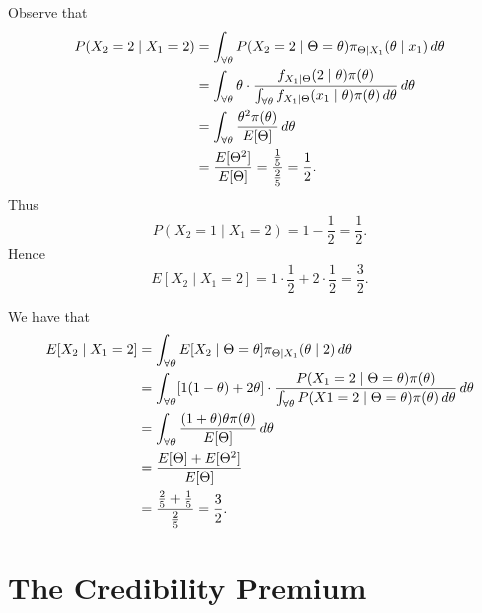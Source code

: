 \documentclass[notoc,notitlepage]{tufte-book}
\begin{document}
\begin{solution}
   Observe that
  \begin{align*}
    P(X_2 = 2 \mid X_1 = 2)
    &= \int_{\forall \theta} P(X_2 = 2 \mid \Theta = \theta) \pi_{\Theta \mid
      X_1}(\theta \mid x_1) \mathop{}\!d{\theta} \\
    &= \int_{\forall \theta} \theta \cdot \frac{f_{X_1 \mid \Theta}(2 \mid
      \theta) \pi(\theta)}{\int_{\forall \theta} f_{X_1 \mid \Theta}(x_1 \mid
      \theta) \pi(\theta) \mathop{}\!d{\theta}} \mathop{}\!d{\theta} \\
    &= \int_{\forall \theta} \frac{\theta^2 \pi(\theta)}{E[\Theta]} \mathop{}\!d{\theta}
    \\
    &= \frac{E[\Theta^2]}{E[\Theta]} = \frac{\frac{1}{5}}{\frac{2}{5}} =
    \frac{1}{2}.
  \end{align*}
  Thus
  \begin{equation*}
    P(X_2 = 1 \mid X_1 = 2) = 1 - \frac{1}{2} = \frac{1}{2}.
  \end{equation*}
  Hence
  \begin{equation*}
    E[X_2 \mid X_1 = 2] = 1 \cdot \frac{1}{2} + 2 \cdot \frac{1}{2} =
    \frac{3}{2}.
  \end{equation*}

  \noindent
   We have that
  \begin{align*}
    E[X_2 \mid X_1 = 2]
    &= \int_{\forall \theta} E[X_2 \mid \Theta = \theta] \pi_{\Theta \mid
      X_1}(\theta \mid 2) \mathop{}\!d{\theta} \\
    &= \int_{\forall \theta} [1(1 - \theta) + 2\theta] \cdot
    \frac{P(X_1 = 2 \mid \Theta = \theta)\pi(\theta)}{\int_{\forall \theta} P(X1
      = 2 \mid \Theta = \theta)\pi(\theta) \mathop{}\!d{\theta}} \mathop{}\!d{\theta} \\
    &= \int_{\forall \theta} \frac{(1 + \theta)\theta\pi(\theta)}{E[\Theta]}
      \mathop{}\!d{\theta} \\
    &= \frac{E[\Theta] + E[\Theta^2]}{E[\Theta]} \\
    &= \frac{\frac{2}{5} + \frac{1}{5}}{\frac{2}{5}} = \frac{3}{2}.
  \end{align*}
\end{solution}


\newpage
\section{The Credibility Premium}%
\label{sec:the_credibility_premium}
\end{document}
